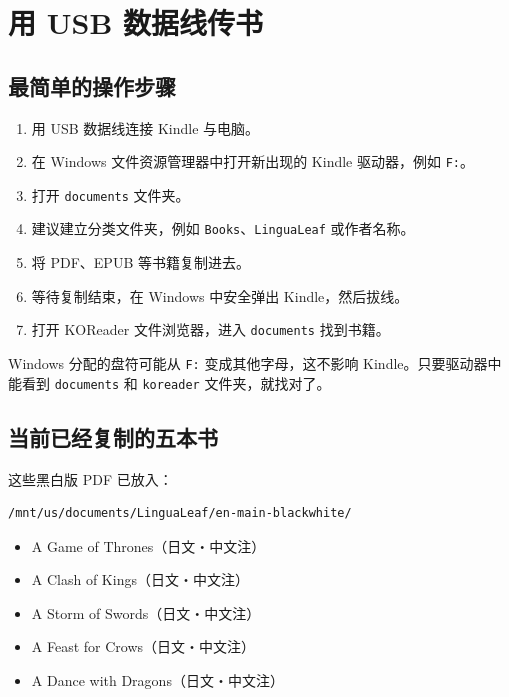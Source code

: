 \documentclass[10pt,a4paper]{article}
\begin{document}
\section{用 USB 数据线传书}

\subsection{最简单的操作步骤}

\begin{enumerate}
  \item 用 USB 数据线连接 Kindle 与电脑。
  \item 在 Windows 文件资源管理器中打开新出现的 Kindle 驱动器，例如 \texttt{F:}。
  \item 打开 \texttt{documents} 文件夹。
  \item 建议建立分类文件夹，例如 \texttt{Books}、\texttt{LinguaLeaf} 或作者名称。
  \item 将 PDF、EPUB 等书籍复制进去。
  \item 等待复制结束，在 Windows 中安全弹出 Kindle，然后拔线。
  \item 打开 KOReader 文件浏览器，进入 \texttt{documents} 找到书籍。
\end{enumerate}

\begin{tipbox}
Windows 分配的盘符可能从 \texttt{F:} 变成其他字母，这不影响 Kindle。只要驱动器中能看到 \texttt{documents} 和 \texttt{koreader} 文件夹，就找对了。
\end{tipbox}

\subsection{当前已经复制的五本书}

这些黑白版 PDF 已放入：

\begin{Verbatim}[fontsize=\small]
/mnt/us/documents/LinguaLeaf/en-main-blackwhite/
\end{Verbatim}

\begin{itemize}
  \item A Game of Thrones（日文・中文注）
  \item A Clash of Kings（日文・中文注）
  \item A Storm of Swords（日文・中文注）
  \item A Feast for Crows（日文・中文注）
  \item A Dance with Dragons（日文・中文注）
\end{itemize}
\end{document}
